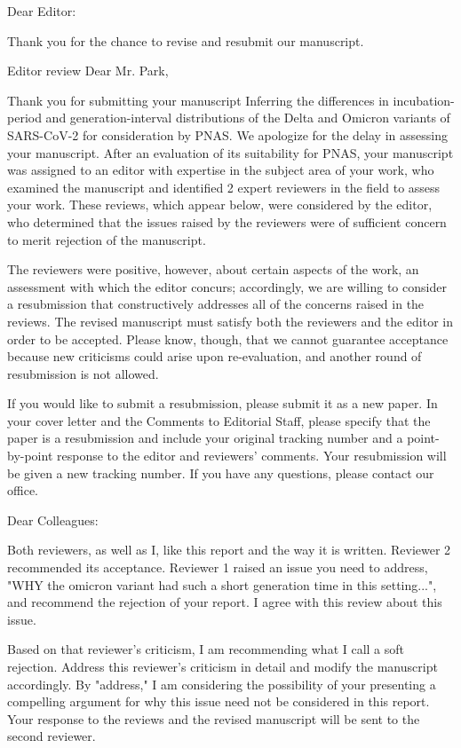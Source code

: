 \documentclass[12pt]{article}
\newcommand{\revtext}{\textsf}
\begin{document}
\noindent Dear Editor:

Thank you for the chance to revise and resubmit our manuscript. 

\revtext{Editor review}
Dear Mr. Park,

Thank you for submitting your manuscript Inferring the differences in incubation-period and generation-interval distributions of the Delta and Omicron variants of SARS-CoV-2 for consideration by PNAS. We apologize for the delay in assessing your manuscript. After an evaluation of its suitability for PNAS, your manuscript was assigned to an editor with expertise in the subject area of your work, who examined the manuscript and identified 2 expert reviewers in the field to assess your work. These reviews, which appear below, were considered by the editor, who determined that the issues raised by the reviewers were of sufficient concern to merit rejection of the manuscript.

The reviewers were positive, however, about certain aspects of the work, an assessment with which the editor concurs; accordingly, we are willing to consider a resubmission that constructively addresses all of the concerns raised in the reviews. The revised manuscript must satisfy both the reviewers and the editor in order to be accepted. Please know, though, that we cannot guarantee acceptance because new criticisms could arise upon re-evaluation, and another round of resubmission is not allowed.

If you would like to submit a resubmission, please submit it as a new paper. In your cover letter and the Comments to Editorial Staff, please specify that the paper is a resubmission and include your original tracking number and a point-by-point response to the editor and reviewers' comments. Your resubmission will be given a new tracking number. If you have any questions, please contact our office.

Dear Colleagues:

Both reviewers, as well as I, like this report and the way it is written. Reviewer 2 recommended its acceptance. Reviewer 1 raised an issue you need to address, "WHY the omicron variant had such a short generation time in this setting...", and 
recommend
 the rejection of your report. I agree with this review about this issue.

Based on that reviewer's criticism, I am recommending what I call a soft rejection. Address this reviewer's criticism in detail and modify the manuscript accordingly. By "address," I am considering the possibility of 
your
 presenting a compelling argument for why this issue need not be considered in this report. Your response to the reviews and the revised manuscript will be sent to the second reviewer.
\end{document}
